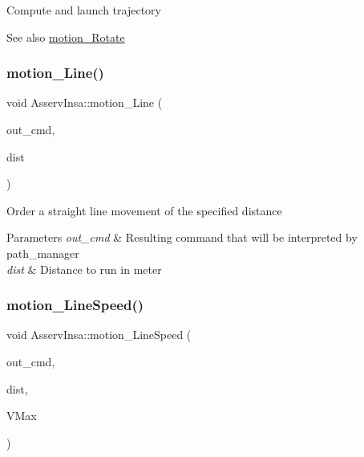 Compute and launch trajectory \begin{DoxySeeAlso}{See also}
\hyperlink{classAsservInsa_ae7c7edab12c43ce352a694e95994c972}{motion\+\_\+\+Rotate} 
\end{DoxySeeAlso}
\mbox{\label{classAsservInsa_ab0fe0ad459e394938598a8b031118edb}} 
\subsubsection{\texorpdfstring{motion\+\_\+\+Line()}{motion\_Line()}}
{\footnotesize\ttfamily void Asserv\+Insa\+::motion\+\_\+\+Line (\begin{DoxyParamCaption}\item[{\hyperlink{structRobotCommand}{Robot\+Command} $\ast$}]{out\+\_\+cmd,  }\item[{float}]{dist }\end{DoxyParamCaption})}

Order a straight line movement of the specified distance 
\begin{DoxyParams}{Parameters}
{\em out\+\_\+cmd} & Resulting command that will be interpreted by path\+\_\+manager \\
\hline
{\em dist} & Distance to run in meter \\
\hline
\end{DoxyParams}
\mbox{\label{classAsservInsa_af0aa05c12a2d8eb278f84e1b7472ca83}} 
\subsubsection{\texorpdfstring{motion\+\_\+\+Line\+Speed()}{motion\_LineSpeed()}}
{\footnotesize\ttfamily void Asserv\+Insa\+::motion\+\_\+\+Line\+Speed (\begin{DoxyParamCaption}\item[{\hyperlink{structRobotCommand}{Robot\+Command} $\ast$}]{out\+\_\+cmd,  }\item[{float}]{dist,  }\item[{float}]{V\+Max }\end{DoxyParamCaption})}

